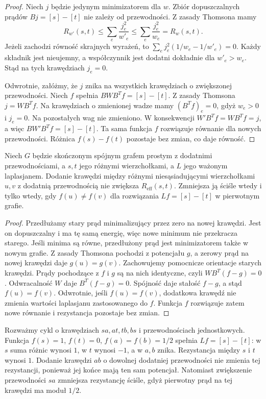 \begin{proof}
Niech $j$ będzie jedynym minimizatorem dla $w$.
Zbiór dopuszczalnych prądów $Bj=[s]-[t]$
nie zależy od przewodności. Z zasady Thomsona mamy
\[
R_{w'}(s,t)\le \sum_e\frac{j_e^2}{w'_e}
\le \sum_e\frac{j_e^2}{w_e}=R_w(s,t).
\]
Jeżeli zachodzi równość skrajnych wyrażeń, to
$\sum_e j_e^2(1/w_e-1/w'_e)=0$.
Każdy składnik jest nieujemny, a współczynnik
jest dodatni dokładnie dla $w'_e>w_e$.
Stąd na tych krawędziach $j_e=0$.

Odwrotnie, załóżmy, że $j$ znika na wszystkich
krawędziach o zwiększonej przewodności.
Niech $f$ spełnia $BWB^Tf=[s]-[t]$.
Z zasady Thomsona $j=WB^Tf$. Na krawędziach
o zmienionej wadze mamy $(B^Tf)_e=0$, gdyż
$w_e>0$ i $j_e=0$. Na pozostałych wag nie zmieniono.
W konsekwencji $W'B^Tf=WB^Tf=j$, a więc
$BW'B^Tf=[s]-[t]$. Ta sama funkcja $f$ rozwiązuje
równanie dla nowych przewodności. Różnica
$f(s)-f(t)$ pozostaje bez zmian, co daje równość.
\end{proof}

\begin{wniosek}
Niech $G$ będzie skończonym spójnym grafem prostym
z dodatnimi przewodnościami, a $s,t$ jego różnymi
wierzchołkami, a $L$ jego ważonym laplasjanem.
Dodanie krawędzi między różnymi niesąsiadującymi
wierzchołkami $u,v$ z dodatnią przewodnością nie zwiększa
$R_{\mathrm{eff}}(s,t)$. Zmniejsza ją ściśle wtedy i tylko
wtedy, gdy $f(u)\ne f(v)$ dla rozwiązania $Lf=[s]-[t]$
w pierwotnym grafie.
\end{wniosek}

\begin{proof}
Przedłużamy stary prąd minimalizujący przez zero na
nowej krawędzi. Jest on dopuszczalny i ma tę samą
energię, więc nowe minimum nie przekracza starego.
Jeśli minima są równe, przedłużony prąd jest
minimizatorem także w nowym grafie. Z zasady Thomsona
pochodzi z potencjału $g$, a zerowy prąd na nowej
krawędzi daje $g(u)=g(v)$. Zachowujemy pomocnicze orientacje starych krawędzi.
Prądy pochodzące z $f$ i $g$ są na nich identyczne,
czyli $WB^T(f-g)=0$. Odwracalność $W$ daje
$B^T(f-g)=0$. Spójność daje stałość $f-g$,
a stąd $f(u)=f(v)$.
Odwrotnie, jeśli $f(u)=f(v)$, dodatkowa krawędź
nie zmienia wartości laplasjanu zastosowanego do $f$.
Funkcja $f$ rozwiązuje zatem nowe równanie i
rezystancja pozostaje bez zmian.
\end{proof}

\begin{przyklad}
Rozważmy cykl o krawędziach $sa,at,tb,bs$ i
przewodnościach jednostkowych. Funkcja
$f(s)=1$, $f(t)=0$, $f(a)=f(b)=1/2$ spełnia
$Lf=[s]-[t]$: w $s$ suma różnic wynosi $1$,
w $t$ wynosi $-1$, a w $a,b$ znika.
Rezystancja między $s$ i $t$ wynosi $1$.
Dodanie krawędzi $ab$ o dowolnej dodatniej
przewodności nie zmienia tej rezystancji,
ponieważ jej końce mają ten sam potencjał.
Natomiast zwiększenie przewodności $sa$ zmniejsza
rezystancję ściśle, gdyż pierwotny prąd na tej
krawędzi ma moduł $1/2$.
\end{przyklad}

